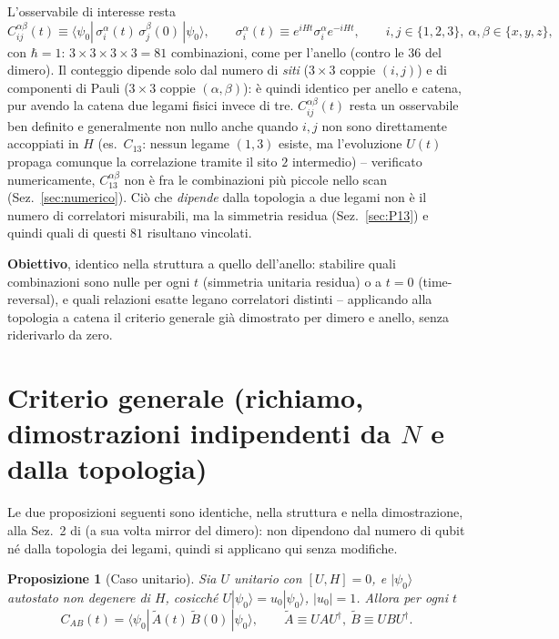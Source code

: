 \documentclass[11pt,a4paper]{article}
\newtheorem{proposizione}{Proposizione}
\begin{document}
L'osservabile di interesse resta
\begin{equation}
C_{ij}^{\alpha\beta}(t) \equiv \langle\psi_0|\,\sigma_i^\alpha(t)\,\sigma_j^\beta(0)\,|\psi_0\rangle,
\qquad \sigma_i^\alpha(t)\equiv e^{iHt}\sigma_i^\alpha e^{-iHt},
\qquad i,j\in\{1,2,3\},\ \alpha,\beta\in\{x,y,z\},
\label{eq:corr-def}
\end{equation}
con $\hbar=1$: $3\times3\times3\times3=81$ combinazioni, come per l'anello (contro le $36$ del
dimero). Il conteggio dipende solo dal numero di \emph{siti} ($3\times3$ coppie $(i,j)$) e di
componenti di Pauli ($3\times3$ coppie $(\alpha,\beta)$): è quindi identico per anello e catena,
pur avendo la catena due legami fisici invece di tre. $C_{ij}^{\alpha\beta}(t)$ resta un
osservabile ben definito e generalmente non nullo anche quando $i,j$ non sono direttamente
accoppiati in $H$ (es.\ $C_{13}$: nessun legame $(1,3)$ esiste, ma l'evoluzione $U(t)$ propaga
comunque la correlazione tramite il sito $2$ intermedio) -- verificato numericamente,
$C_{13}^{\alpha\beta}$ non è fra le combinazioni più piccole nello scan (Sez.~\ref{sec:numerico}).
Ciò che \emph{dipende} dalla topologia a due legami non è il numero di correlatori misurabili, ma
la simmetria residua (Sez.~\ref{sec:P13}) e quindi quali di questi $81$ risultano vincolati.

\textbf{Obiettivo}, identico nella struttura a quello dell'anello: stabilire quali combinazioni
sono nulle per ogni $t$ (simmetria unitaria residua) o a $t=0$ (time-reversal), e quali relazioni
esatte legano correlatori distinti -- applicando alla topologia a catena il criterio generale già
dimostrato per dimero e anello, senza riderivarlo da zero.

\section{Criterio generale (richiamo, dimostrazioni indipendenti da $N$ e dalla topologia)}

Le due proposizioni seguenti sono identiche, nella struttura e nella dimostrazione, alla Sez.~2
di \texttt{} (a sua volta mirror del
dimero): non dipendono dal numero di qubit né dalla topologia dei legami, quindi si applicano qui
senza modifiche.

\begin{proposizione}[Caso unitario]
\label{prop:unitaria}
Sia $U$ unitario con $[U,H]=0$, e $|\psi_0\rangle$ autostato non degenere di $H$, cosicché
$U|\psi_0\rangle=u_0|\psi_0\rangle$, $|u_0|=1$. Allora per ogni $t$
\begin{equation}
C_{AB}(t) = \langle\psi_0|\,\widetilde A(t)\,\widetilde B(0)\,|\psi_0\rangle,
\qquad \widetilde A\equiv UAU^\dagger,\ \widetilde B\equiv UBU^\dagger.
\end{equation}
\end{proposizione}
\end{document}
